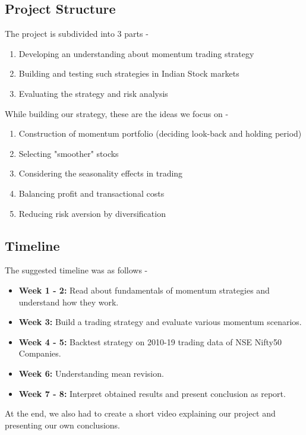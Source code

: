 \subsection*{Project Structure}

The project is subdivided into 3 parts -
\begin{enumerate}
    \item Developing an understanding about momentum trading strategy
    \item Building and testing such strategies in Indian Stock markets
    \item Evaluating the strategy and risk analysis
\end{enumerate}

\bigskip

While building our strategy, these are the ideas we focus on -

\begin{enumerate}
    \item Construction of momentum portfolio (deciding look-back and holding period)
    \item Selecting "smoother" stocks
    \item Considering the seasonality effects in trading
    \item Balancing profit and transactional costs
    \item Reducing risk aversion by diversification
\end{enumerate}

\subsection*{Timeline}

The suggested timeline was as follows -

\begin{itemize}
    \item \textbf{Week 1 - 2:} Read about fundamentals of momentum strategies and understand how they work.
    \item \textbf{Week 3:} Build a trading strategy and evaluate various momentum scenarios.
    \item \textbf{Week 4 - 5:} Backtest strategy on 2010-19 trading data of NSE Nifty50 Companies.
    \item \textbf{Week 6:} Understanding mean revision.
    \item \textbf{Week 7 - 8:} Interpret obtained results and present conclusion as report.
\end{itemize}

At the end, we also had to create a short video explaining our project and presenting our own conclusions.
